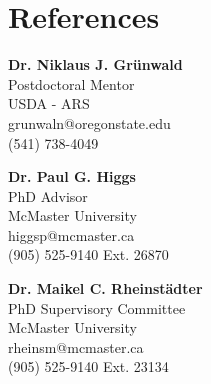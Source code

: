 



\vspace{-10pt}
\section{References}


\begin{minipage}[ht]{0.33\textwidth}
\textbf{Dr. Niklaus J. Gr{\"u}nwald}\\
Postdoctoral Mentor\\
USDA - ARS\\
grunwaln@oregonstate.edu\\
(541) 738-4049
\end{minipage}
\begin{minipage}[ht]{0.33\textwidth}
\textbf{Dr. Paul G. Higgs}\\
PhD Advisor\\
McMaster University\\
higgsp@mcmaster.ca\\
(905) 525-9140 Ext. 26870
\end{minipage}
\begin{minipage}[ht]{0.33\textwidth}
\textbf{Dr. Maikel C. Rheinstädter}\\
PhD Supervisory Committee\\
McMaster University\\
rheinsm@mcmaster.ca\\
(905) 525-9140 Ext. 23134
\end{minipage}



